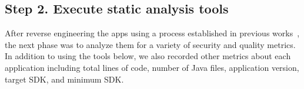 \documentclass{sig-alternate-05-2015}
\newcommand{\todo}[1]{\textcolor{cyan}{\textbf{[#1]}}}
\begin{document}
%
%
%
%
%
%


\subsection{Step 2. Execute static analysis tools}
\label{sec: analysis}
After reverse engineering the apps using a process established in previous works~\cite{Lee_2013,6687155}, the next phase was to analyze them for a variety of security and quality metrics. In addition to using the tools below, we also recorded other metrics about each application including total lines of code, number of Java files, application version, target SDK, and minimum SDK.
\end{document}

